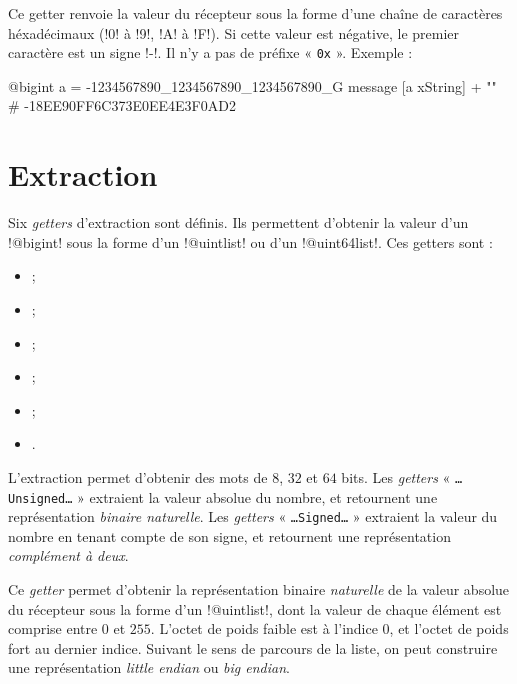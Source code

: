 
Ce getter renvoie la valeur du récepteur sous la forme d'une chaîne de caractères héxadécimaux (\ggs!0! à \ggs!9!, \ggs!A! à \ggs!F!). Si cette valeur est négative, le premier caractère est un signe \ggs!-!. Il n'y a pas de préfixe « \texttt{0x} ». Exemple :

\begin{galgas}
@bigint a = -1234567890_1234567890_1234567890_G
message [a xString] + "\n" # -18EE90FF6C373E0EE4E3F0AD2
\end{galgas}









\section{Extraction}

Six \emph{getters} d'extraction sont définis. Ils permettent d'obtenir la valeur d'un \ggs!@bigint! sous la forme d'un \ggs!@uintlist! ou d'un \ggs!@uint64list!. Ces getters sont :
\begin{itemize}
  \item {} ;
  \item {} ;
  \item {} ;
  \item {} ;
  \item {} ;
  \item {}.
\end{itemize}

L'extraction permet d'obtenir des mots de $8$, $32$ et $64$ bits. Les \emph{getters} « \texttt{…Unsigned…} » extraient la valeur absolue du nombre, et retournent une représentation \emph{binaire naturelle}. Les \emph{getters} « \texttt{…Signed…} » extraient la valeur du nombre en tenant compte de son signe, et retournent une représentation \emph{complément à deux}.


Ce \emph{getter} permet d'obtenir la représentation binaire \emph{naturelle} de la valeur absolue du récepteur sous la forme d'un \ggs!@uintlist!, dont la valeur de chaque élément est comprise entre $0$ et $255$. L'octet de poids faible est à l'indice $0$, et l'octet de poids fort au dernier indice. Suivant le sens de parcours de la liste, on peut construire une représentation \emph{little endian} ou \emph{big endian}.

